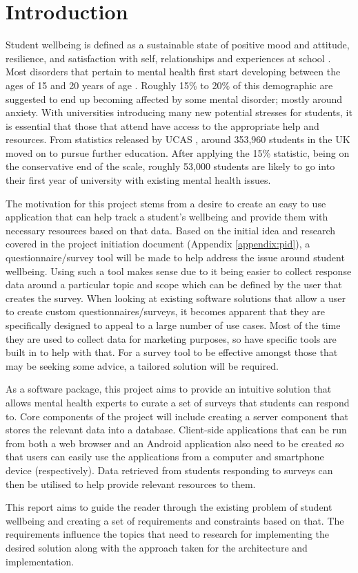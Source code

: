 \section{Introduction}

Student wellbeing is defined as a sustainable state of positive mood and attitude, resilience, and satisfaction with self, relationships and experiences
at school \cite{noble2008scoping}.
Most disorders that pertain to mental health first start developing between the ages of 15 and 20 years of age \cite{kessler2005lifetime}.
Roughly 15\% to 20\% of this demographic \cite{kessler2005lifetime} are suggested to end up becoming affected by some mental disorder; mostly 
around anxiety.
With universities introducing many new potential stresses for students, it is essential that those that attend have access to the appropriate help
and resources.
From statistics released by UCAS \cite{ucas_2018}, around 353,960 students in the UK moved on to pursue further education.
After applying the 15\% statistic, being on the conservative end of the scale, roughly 53,000 students are likely to go into their first year of
university with existing mental health issues.

The motivation for this project stems from a desire to create an easy to use application that can help track a student's wellbeing and provide them 
with necessary resources based on that data.
Based on the initial idea and research covered in the project initiation document (Appendix \ref{appendix:pid}), a questionnaire/survey tool will 
be made to help address the issue around student wellbeing.
Using such a tool makes sense due to it being  easier to collect response data around a particular topic and scope which can be defined by the user
that creates the survey.
When looking at existing software solutions that allow a user to create custom questionnaires/surveys, it becomes apparent that they are specifically 
designed to appeal to a large number of use cases.
Most of the time they are used to collect data for marketing purposes, so have specific tools are built in to help with that.
For a survey tool to be effective amongst those that may be seeking some advice, a tailored solution will be required.

As a software package, this project aims to provide an intuitive solution that allows mental health experts to curate a set of surveys that students
can respond to.
Core components of the project will include creating a server component that stores the relevant data into a database.
Client-side applications that can be run from both a web browser and an Android application also need to be created so that users can easily use the applications from a computer and smartphone device (respectively).
Data retrieved from students responding to surveys can then be utilised to help provide relevant resources to them.

This report aims to guide the reader through the existing problem of student wellbeing and creating a set of requirements and constraints based on that.
The requirements influence the topics that need to research for implementing the desired solution along with the approach taken for the 
architecture and implementation.